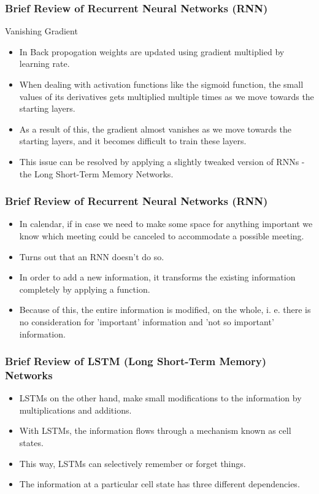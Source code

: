  
 
\begin{frame}[fragile]
  \frametitle{Brief Review of Recurrent Neural Networks (RNN)}
Vanishing Gradient
  \begin{itemize}
  \item In Back propogation weights are updated using gradient multiplied by learning rate.
  \item When dealing with activation functions like the sigmoid function, the small values of its derivatives gets multiplied multiple times as we move towards the starting layers. 
  \item As a result of this, the gradient almost vanishes as we move towards the starting layers, and it becomes difficult to train these layers.
  \item This issue can be resolved by applying a slightly tweaked version of RNNs - the Long Short-Term Memory Networks.
  	  \end{itemize}
 \end{frame} 
 
\begin{frame}[fragile]
  \frametitle{Brief Review of Recurrent Neural Networks (RNN)}

  \begin{itemize}
  \item In calendar, if in case we need to make some space for anything important we know which meeting could be canceled to accommodate a possible meeting.
  \item Turns out that an RNN doesn't do so. 
  \item In order to add a new information, it transforms the existing information completely by applying a function. 
    \item Because of this, the entire information is modified, on the whole, i. e. there is no consideration for 'important' information and 'not so important' information.
  	  \end{itemize}
 \end{frame} 
 
\begin{frame}[fragile]
  \frametitle{Brief Review of LSTM (Long Short-Term Memory) Networks}

  \begin{itemize}
  \item LSTMs on the other hand, make small modifications to the information by multiplications and additions. 
  \item With LSTMs, the information flows through a mechanism known as cell states. 
  \item This way, LSTMs can selectively remember or forget things. 
  \item The information at a particular cell state has three different dependencies.
  	  \end{itemize}
 \end{frame} 
 
